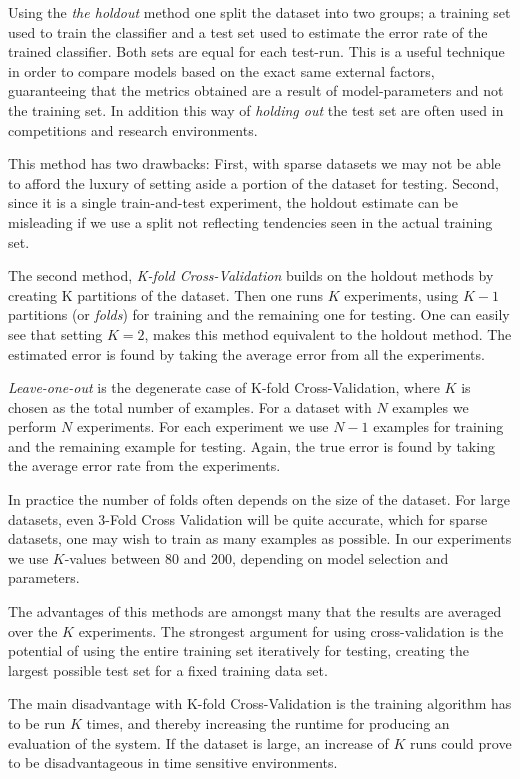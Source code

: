 Using the \textit{the holdout} method one split the dataset into two groups; a
training set used to train the classifier and a test set used to estimate the
error rate of the trained classifier. Both sets are equal for each test-run.
This is a useful technique in order to compare models based on the exact same
external factors, guaranteeing that the metrics obtained are a result of
model-parameters and not the training set. In addition this way of
\textit{holding out} the test set are often used in competitions and research
environments.

This method has two drawbacks: First, with sparse datasets we may not be able
to afford the luxury of setting aside a portion of the dataset for testing.
Second, since it is a single train-and-test experiment, the holdout estimate
can be misleading if we use a split not reflecting tendencies seen in the
actual training set.

The second method, \textit{K-fold Cross-Validation} builds on the holdout
methods by creating K partitions of the dataset. Then one runs $K$ experiments,
using $K-1$ partitions (or \textit{folds}) for training and the remaining one
for testing. One can easily see that setting $K=2$, makes this method
equivalent to the holdout method. The estimated error is found by taking the
average error from all the experiments.

\textit{Leave-one-out} is the degenerate case of K-fold Cross-Validation, where
$K$ is chosen as the total number of examples. For a dataset with $N$ examples
we perform $N$ experiments. For each experiment we use $N-1$ examples for
training and the remaining example for testing. Again, the true error is found
by taking the average error rate from the experiments.

In practice the number of folds often depends on the size of the dataset. For
large datasets, even 3-Fold Cross Validation will be quite accurate, which for
sparse datasets, one may wish to train as many examples as possible. In our
experiments we use $K$-values between $80$ and $200$, depending on model
selection and parameters.

The advantages of this methods are amongst many that the results are averaged
over the $K$ experiments. The strongest argument for using cross-validation is
the potential of using the entire training set iteratively for testing, creating
the largest possible test set for a fixed training data set.

The main disadvantage with K-fold Cross-Validation is the training algorithm
has to be run $K$ times, and thereby increasing the runtime for producing an
evaluation of the system. If the dataset is large, an increase of $K$ runs
could prove to be disadvantageous in time sensitive environments.

